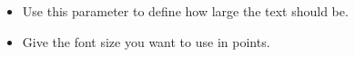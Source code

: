 

\begin{itemize}
\item Use this parameter to define how large the text should be. 
\item Give the font size you want to use in points. 
\end{itemize}
